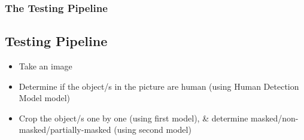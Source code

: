 \begin{frame}
    \frametitle{The Testing Pipeline}
    \subsection{Testing Pipeline}
    \begin{itemize}
        \item Take an image
        \item Determine if the object/s in the picture are human (using Human Detection Model model)
        \item Crop the object/s one by one (using first model), \& determine masked/non-masked/partially-masked (using second model)
    \end{itemize}
\end{frame}
